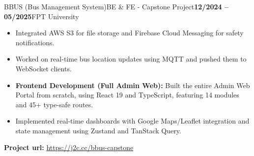 \documentclass[]{style}
\newcommand{\bolddate}[1]{\textbf{#1}}
\begin{document}
\begin{section}
\begin{projectsubsection}{BBUS (Bus Management System)}{BE \& FE - Capstone Project}{\bolddate{12/2024 -- 05/2025}}{FPT University}
\begin{itemize}
     \item Integrated AWS S3 for file storage and Firebase Cloud Messaging for safety notifications.
     \item Worked on real-time bus location updates using MQTT and pushed them to WebSocket clients.
     \item \textbf{Frontend Development (Full Admin Web):} Built the entire Admin Web Portal from scratch, using React 19 and TypeScript, featuring 14 modules and 45+ type-safe routes.
     \item Implemented real-time dashboards with Google Maps/Leaflet integration and state management using Zustand and TanStack Query.
   \end{itemize}
   \item \textbf{Project url:} \href{https://j2c.cc/bbus-capstone}{https://j2c.cc/bbus-capstone}
 \end{projectsubsection}


\end{section}
\end{document}
